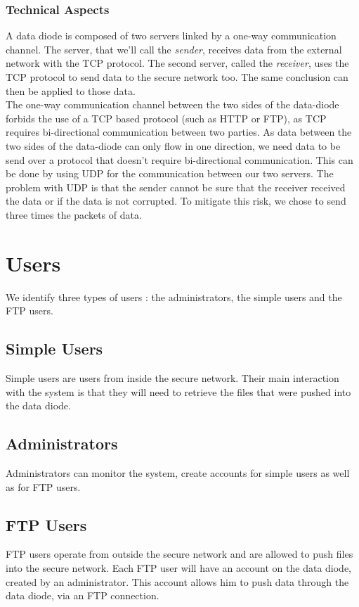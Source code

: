 \documentclass[a4paper,11pt]{article}
\begin{document}
\subsubsection{Technical Aspects}
A data diode is composed of two servers linked by a one-way communication channel. The server, that we'll call the \textit{sender}, receives data from the external network with the TCP protocol. The second server, called the \textit{receiver}, uses the TCP protocol to send data to the secure network too. The same conclusion can then be applied to those data.\\

The one-way communication channel between the two sides of the data-diode forbids the use of a TCP based protocol (such as HTTP or FTP), as TCP requires bi-directional communication between two parties. As data between the two sides of the data-diode can only flow in one direction, we need data to be send over a protocol that doesn't require bi-directional communication. This can be done by using UDP for the communication between our two servers. The problem with UDP is that the sender cannot be sure that the receiver received the data or if the data is not corrupted. To mitigate this risk, we chose to send three times the packets of data.


\section{Users}
We identify three types of users : the administrators, the simple users and the FTP users.
\subsection{Simple Users}
Simple users are users from inside the secure network. Their main interaction with the system is that they will need to retrieve the files that were pushed into the data diode.

\subsection{Administrators}
Administrators can monitor the system, create accounts for simple users as well as for FTP users.

\subsection{FTP Users}
FTP users operate from outside the secure network and are allowed to push files into the secure network. Each FTP user will have an account on the data diode, created by an administrator. This account allows him to push data through the data diode, via an FTP connection.
\end{document}

